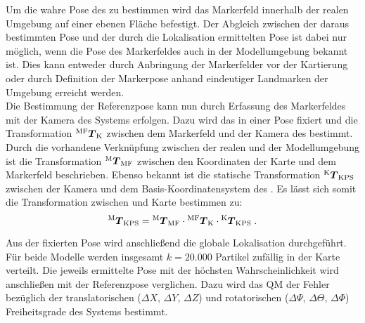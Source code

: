 
Um die wahre Pose des  zu bestimmen wird das Markerfeld innerhalb der realen Umgebung auf einer ebenen Fläche befestigt. Der Abgleich zwischen der daraus bestimmten Pose und der durch die Lokalisation ermittelten Pose ist dabei nur möglich, wenn die Pose des Markerfeldes auch in der Modellumgebung bekannt ist. Dies kann entweder durch Anbringung der Markerfelder vor der Kartierung oder durch Definition der Markerpose anhand eindeutiger Landmarken der Umgebung erreicht werden.\\

Die Bestimmung der Referenzpose kann nun durch Erfassung des Markerfeldes mit der Kamera des Systems erfolgen. Dazu wird das \kps{} in einer Pose fixiert und die Transformation ${^{\mathrm{MF}}\mbox{\boldmath{$T$}}_{\mathrm{K}}}$ zwischen dem Markerfeld und der Kamera des  bestimmt. Durch die vorhandene Verknüpfung zwischen der realen und der Modellumgebung ist die Transformation ${^{\mathrm{M}}\mbox{\boldmath{$T$}}_{\mathrm{MF}}}$ zwischen den Koordinaten der Karte und dem Markerfeld beschrieben. Ebenso bekannt ist die statische Transformation ${^{\mathrm{K}}\mbox{\boldmath{$T$}}_{\mathrm{KPS}}}$ zwischen der Kamera und dem Basis-Koordinatensystem des . Es lässt sich somit die Transformation zwischen \kps{} und Karte bestimmen zu:
%
%
\begin{equation}
{^{\mathrm{M}}\mbox{\boldmath{$T$}}_{\mathrm{KPS}}} = {^{\mathrm{M}}\mbox{\boldmath{$T$}}_{\mathrm{MF}}} \cdot {^{\mathrm{MF}}\mbox{\boldmath{$T$}}_{\mathrm{K}}} \cdot {^{\mathrm{K}}\mbox{\boldmath{$T$}}_{\mathrm{KPS}}} \; \text{.}
\end{equation}

Aus der fixierten Pose wird anschließend die globale Lokalisation durchgeführt. Für beide Modelle werden insgesamt $k=20.000$ Partikel zufällig in der Karte verteilt. Die jeweils ermittelte Pose mit der höchsten Wahrscheinlichkeit wird anschließen mit der Referenzpose verglichen. Dazu wird das QM der Fehler bezüglich der translatorischen ($\Delta X$, $\Delta Y$, $\Delta Z$) und rotatorischen ($\Delta \Psi$, $\Delta \Theta$, $\Delta \Phi$) Freiheitsgrade des Systems bestimmt.\\

